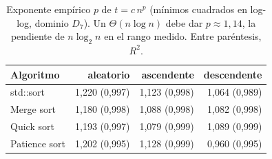 %
\begin{table}[H]
\centering
\small
\caption{Exponente empírico $p$ de $t = c\,n^{p}$ (mínimos cuadrados en log-log, dominio $D_7$). Un $\Theta(n\log n)$ debe dar $p\approx1{,}14$, la pendiente de $n\log_2 n$ en el rango medido. Entre paréntesis, $R^2$.}
\label{tab:sorting-exponents}
\begin{tabular}{lrrr}
\hline\hline
Algoritmo & aleatorio & ascendente & descendente \\
\hline
std::sort & 1{,}220 (0{,}997) & 1{,}123 (0{,}998) & 1{,}064 (0{,}989) \\
Merge sort & 1{,}180 (0{,}998) & 1{,}088 (0{,}998) & 1{,}082 (0{,}998) \\
Quick sort & 1{,}193 (0{,}997) & 1{,}079 (0{,}999) & 1{,}089 (0{,}999) \\
Patience sort & 1{,}202 (0{,}995) & 1{,}128 (0{,}999) & 0{,}960 (0{,}995) \\
\hline\hline
\end{tabular}
\end{table}
